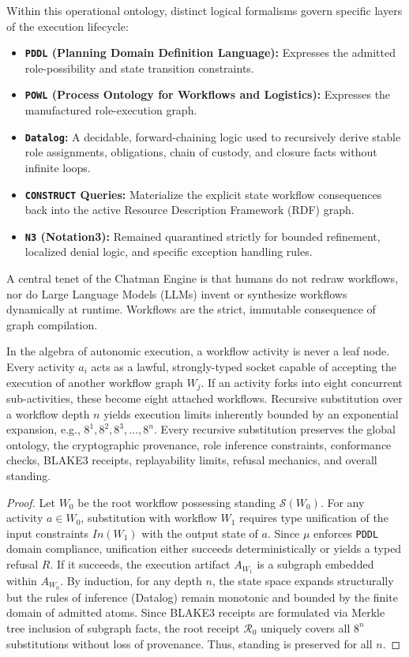 Within this operational ontology, distinct logical formalisms govern specific layers of the execution lifecycle:
\begin{itemize}
    \item \textbf{\texttt{PDDL} (Planning Domain Definition Language):} Expresses the admitted role-possibility and state transition constraints.
    \item \textbf{\texttt{POWL} (Process Ontology for Workflows and Logistics):} Expresses the manufactured role-execution graph.
    \item \textbf{\texttt{Datalog}:} A decidable, forward-chaining logic used to recursively derive stable role assignments, obligations, chain of custody, and closure facts without infinite loops.
    \item \textbf{\texttt{CONSTRUCT} Queries:} Materialize the explicit state workflow consequences back into the active Resource Description Framework (RDF) graph.
    \item \textbf{\texttt{N3} (Notation3):} Remained quarantined strictly for bounded refinement, localized denial logic, and specific exception handling rules.
\end{itemize}

A central tenet of the Chatman Engine is that humans do not redraw workflows, nor do Large Language Models (LLMs) invent or synthesize workflows dynamically at runtime. Workflows are the strict, immutable consequence of graph compilation.

\begin{theorem}
In the algebra of autonomic execution, a workflow activity is never a leaf node. Every activity $a_i$ acts as a lawful, strongly-typed socket capable of accepting the execution of another workflow graph $W_j$. If an activity forks into eight concurrent sub-activities, these become eight attached workflows. Recursive substitution over a workflow depth $n$ yields execution limits inherently bounded by an exponential expansion, e.g., $8^1, 8^2, 8^3, \dots, 8^n$. Every recursive substitution preserves the global ontology, the cryptographic provenance, role inference constraints, conformance checks, BLAKE3 receipts, replayability limits, refusal mechanics, and overall standing.
\end{theorem}

\begin{proof}
Let $W_0$ be the root workflow possessing standing $\mathcal{S}(W_0)$. For any activity $a \in W_0$, substitution with workflow $W_1$ requires type unification of the input constraints $In(W_1)$ with the output state of $a$. Since $\mu$ enforces \texttt{PDDL} domain compliance, unification either succeeds deterministically or yields a typed refusal $R$. If it succeeds, the execution artifact $A_{W_1}$ is a subgraph embedded within $A_{W_0}$. By induction, for any depth $n$, the state space expands structurally but the rules of inference (Datalog) remain monotonic and bounded by the finite domain of admitted atoms. Since BLAKE3 receipts are formulated via Merkle tree inclusion of subgraph facts, the root receipt $\mathcal{R}_0$ uniquely covers all $8^n$ substitutions without loss of provenance. Thus, standing is preserved for all $n$.
\end{proof}

